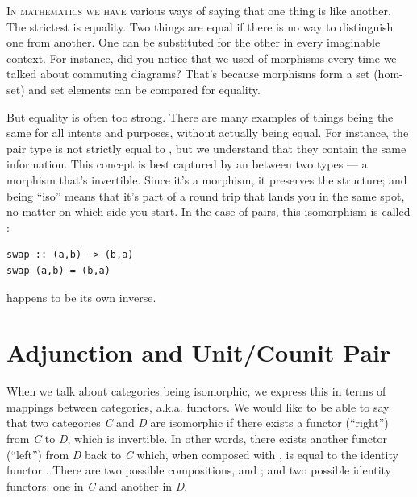 \lettrine[lhang=0.17]{I}{n mathematics we have} various ways of saying that one thing is like
another. The strictest is equality. Two things are equal if there is no
way to distinguish one from another. One can be substituted for the
other in every imaginable context. For instance, did you notice that we
used  of morphisms every time we talked about commuting
diagrams? That's because morphisms form a set (hom-set) and set elements
can be compared for equality.

But equality is often too strong. There are many examples of things
being the same for all intents and purposes, without actually being
equal. For instance, the pair type  is not
strictly equal to , but we understand that they
contain the same information. This concept is best captured by an
 between two types --- a morphism that's invertible.
Since it's a morphism, it preserves the structure; and being ``iso''
means that it's part of a round trip that lands you in the same spot, no
matter on which side you start. In the case of pairs, this isomorphism
is called :

\begin{verbatim}
swap :: (a,b) -> (b,a)
swap (a,b) = (b,a)
\end{verbatim}
 happens to be its own inverse.

\section{Adjunction and Unit/Counit
Pair}\label{adjunction-and-unitcounit-pair}

When we talk about categories being isomorphic, we express this in terms
of mappings between categories, a.k.a. functors. We would like to be
able to say that two categories \emph{C} and \emph{D} are isomorphic if
there exists a functor  (``right'') from \emph{C} to \emph{D},
which is invertible. In other words, there exists another functor
 (``left'') from \emph{D} back to \emph{C} which, when
composed with , is equal to the identity functor .
There are two possible compositions,  and
; and two possible identity functors: one in \emph{C}
and another in \emph{D}.

\begin{figure}[H]
\centering
{}
\end{figure}


